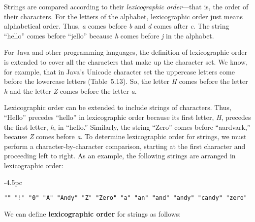 Strings are compared according to their {\em lexicographic
order}---that is, the order of their characters.  For the letters of
the alphabet, lexicographic order just means alphabetical order.
Thus, {\it a} comes before {\it b} and {\it d} comes after {\it
c}. The string ``hello'' comes before ``jello'' because {\it h} comes
before {\it j} in the alphabet.

For Java and other programming languages, the definition of
lexicographic order is extended to cover all the characters that make
up the character set.  We know, for example, that in Java's Unicode
character set the uppercase letters come before the lowercase letters
(Table~5.13).  So, the letter {\it H} comes before the letter
{\it h} and the letter {\it Z} comes before the letter {\it a}.


Lexicographic order can be extended to
include strings of characters.  Thus, ``Hello'' precedes ``hello'' in
lexicographic order because its first letter, {\it H}, precedes the first
letter, {\it h}, in ``hello.'' Similarly, the string ``Zero'' comes before
``aardvark,'' because {\it Z} comes before {\it a}.  To determine
lexicographic order for strings, we must perform a
character-by-character comparison, starting at the first character and
proceeding left to right.  As an example, the following strings are
arranged in lexicographic order:

\begin{jjjlistingleft}[30.5pc]{-4.5pc}
\begin{lstlisting}[stringstyle=\color{black}]
"" "!" "0" "A" "Andy" "Z" "Zero" "a" "an" "and" "andy" "candy" "zero"
\end{lstlisting}
\end{jjjlistingleft}

\noindent We can define {\bf lexicographic order} for strings as follows:



